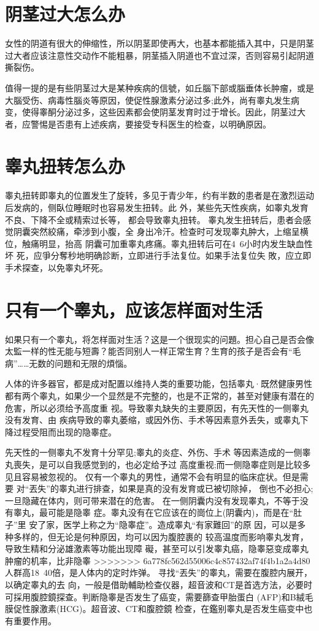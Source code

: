 \documentclass[12pt,UTF8]{ctexbook}
\begin{document}
\section{阴茎过大怎么办}

女性的阴道有很大的伸缩性，所以阴茎即使再大，也基本都能插入其中，只是阴茎过大者应该注意性交动作不能粗暴，阴茎插入阴道也不宜过深，否则容易引起阴道撕裂伤。

值得一提的是有些阴茎过大是某种疾病的信號，如丘腦下部或腦垂体长肿瘤，或是大腦受伤、病毒性腦炎等原因，使促性腺激素分泌过多;此外，尚有睾丸发生病变，使得睾酮分泌过多，这些因素都会使阴茎发育时过于增长。因此，阴茎过大者，应警惕是否患有上述疾病，要接受专科医生的检查，以明确原因。

\section{睾丸扭转怎么办}

睾丸扭转即睾丸的位置发生了旋转，多见于青少年，约有半数的患者是在激烈运动后发病的，侧臥位睡眠时也容易发生扭转。此
外，某些先天性疾病，如睾丸发育不良、下降不全或精索过长等，
都会导致睾丸扭转。
睾丸发生扭转后，患者会感觉阴囊突然絞痛，牵涉到小腹，全
身出冷汗。检查时可发现睾丸肿大，上缩呈横位，触痛明显，抬高
阴囊可加重睾丸疼痛。睾丸扭转后可在4~6小时内发生缺血性坏
死，应爭分奪秒地明确診断，立即进行手法复位。如果手法复位失
敗，应立即手术探查，以免睾丸坏死。

\section{只有一个睾丸，应该怎样面对生活}

如果只有一个睾丸，将怎样面对生活？这是一个很现实的问題。担心自己是否会像太監一样的性无能与短壽？能否同别人一样正常生育？生育的孩子是否会有“毛病”……无数的问題和无限的煩惱。

人体的许多器官，都是成对配置以维持人类的重要功能，包括睾丸·既然健康男性都有两个睾丸，如果少一个显然是不完整的，也是不正常的，甚至对健康有潜在的危害，所以必须给予高度重
视。导致睾丸缺失的主要原因，有先天性的一侧睾丸没有发育、由
疾病导致的睾丸萎缩，或因外伤、手术等因素意外丢失，或睾丸下
降过程受阻而出现的隐睾症。

先天性的一侧睾丸不发育十分罕见;睾丸的炎症、外伤、手术
等因素造成的一侧睾丸喪失，是可以自我感觉到的，也必定给予过
高度重视;而一侧隐睾症则是比较多见且容易被忽视的。
仅有一个睾丸的男性，通常不会有明显的临床症状。但是需要
对“丟失”的睾丸进行排查，如果是真的没有发育或已被切除掉，
倒也不必担心;一旦隐藏在体内，则可带来潜在的危害。
在一侧阴囊内没有发现睾丸，不等于没有睾丸，最可能是隐睾
症。睾丸没有在它应该在的崗位上(阴囊内)，而是在“肚子”里
安了家，医学上称之为“隐睾症”。造成睾丸“有家難回”的原
因，可以是多种多样的，但无论是何种原因，均可以因为腹腔裹的
较高温度而影响睾丸发育，导致生精和分泌雄激素等功能出现障
礙，甚至可以引发睾丸癌，隐睾惡变成睾丸肿瘤的机率，比非隐睾
>>>>>>> 6a778fc562d55006c4c857432af74f4b1a2a4d80
人群高18~40倍，是人体内的定时炸弹。
寻找“丟失”的睾丸，需要在腹腔内展开，以确定睾丸的去
向，一般是借助輔助检查仪器，超音波和CT是首选方法，必要时
可採用腹腔鏡探查。判断隐睾是否发生了癌变，需要篩查甲胎蛋白
(AFP)和B絨毛膜促性腺激素(HCG)。超音波、CT和腹腔鏡
检查，在鑑别睾丸是否发生癌变中也有重要作用。
\end{document}
